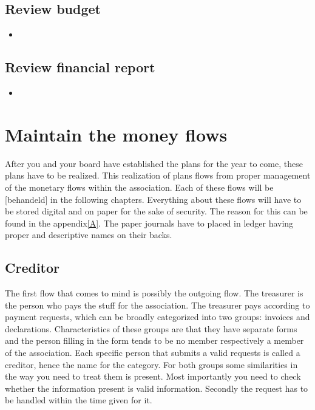\documentclass{report}
\begin{document}
\subsection{Review budget}
\begin{itemize}
\vspace{-1mm}
\itemsep-1mm 
\item
\end{itemize}

\subsection{Review financial report}
\begin{itemize} 
\vspace{-1mm}
\itemsep-1mm 
\item 
\end{itemize}

\section{Maintain the money flows}
After you and your board have established the plans for the year to come, these plans have to be realized. This realization of plans flows from proper management of the monetary flows within the association. Each of these flows will be [behandeld] in the following chapters. Everything about these flows will have to be stored digital and on paper for the sake of security. The reason for this can be found in the appendix\ref{A}. The paper journals have to placed in ledger having proper and descriptive names on their backs.   

\subsection{Creditor}
The first flow that comes to mind is possibly the outgoing flow. The treasurer is the person who pays the stuff for the association. The treasurer pays according to payment requests, which can be broadly categorized into two groups: invoices and declarations. Characteristics of these groups are that they have separate forms and the person filling in the form tends to be no member respectively a member of the association. Each specific person that submits a valid requests is called a creditor, hence the name for the category. For both groups some similarities in the way you need to treat them is present. Most importantly you need to check whether the information present is valid information. Secondly the request has to be handled within the time given for it.          
\end{document}
